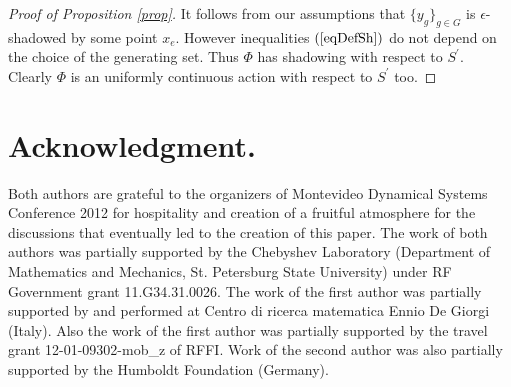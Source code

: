 \documentclass[12pt]{article}
\theoremstyle{plain}
\theoremstyle{definition}
\begin{document}
\begin{proof}[Proof of Proposition \ref{prop}]
It follows from our assumptions that $\{y_{g}\}_{g\in G}$ is $\epsilon$-shadowed by some point $x_e$. However inequalities $(\ref{eqDefSh})$ do not depend on the choice of the generating set. Thus $\Phi$ has shadowing with respect to $S^{\prime}$. Clearly $\Phi$ is an uniformly continuous action with respect to $S^{\prime}$ too.

\end{proof}


\section{Acknowledgment.}

Both authors are grateful to the organizers of Montevideo Dynamical Systems Conference 2012 for hospitality and creation of a fruitful atmosphere for the discussions that eventually led to the creation of this paper.
The work of both authors was partially supported  by the Chebyshev Laboratory (Department of Mathematics and Mechanics, St. Petersburg State University)  under RF Government grant 11.G34.31.0026. The work of the first author was partially supported by and performed at Centro di ricerca matematica Ennio De Giorgi (Italy). Also the work of the first author was partially supported by the travel grant 12-01-09302-mob\_z of RFFI. Work of the second author was also partially supported by the Humboldt Foundation (Germany).



\end{document}
